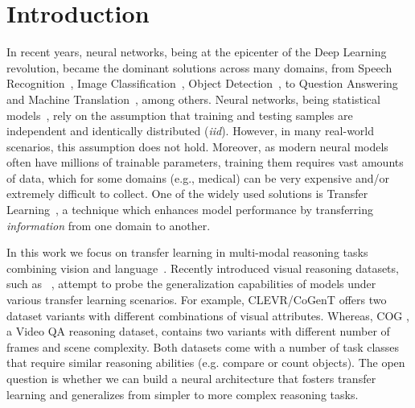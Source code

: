 \section{Introduction}
In recent years, neural networks, being at the epicenter of the Deep Learning~\cite{lecun2015deep} revolution, became the dominant solutions across many domains, from Speech Recognition~\cite{graves2013speech}, Image Classification~\cite{krizhevsky2012imagenet}, Object Detection~\cite{redmon2016you}, to Question Answering~\cite{weston2014memory} and Machine Translation~\cite{bahdanau2014neural}, among others.
Neural networks, being statistical models~\cite{ripley1993statistical,warner1996understanding}, rely on the assumption that training and testing samples are independent and identically distributed (\textit{iid}).
However, in many real-world scenarios, this assumption does not hold. Moreover, as modern neural models often have millions of trainable parameters, training them requires vast amounts of data, which for some domains (e.g., medical) can be very expensive and/or extremely difficult to collect.
One of the widely used solutions is Transfer Learning~\cite{pan2009survey,weiss2016survey}, a technique which enhances model performance by transferring \emph{information} from one domain to another.


In this work we focus on transfer learning in multi-modal reasoning tasks combining vision and language~\cite{mogadala2019trends}. Recently introduced visual reasoning datasets, such as ~\cite{johnson2017clevr,yang2018dataset,song2018explore}, attempt to probe the generalization capabilities of models under various transfer learning scenarios. For example, CLEVR/CoGenT \cite{johnson2017clevr} offers two dataset variants with different combinations of visual attributes. Whereas, COG \cite{yang2018dataset}, a Video QA reasoning dataset, contains two variants with different number of frames and scene complexity.  Both datasets come with a number of task classes that require similar reasoning abilities (e.g. compare or count objects).
The open question is whether we can build a neural architecture that fosters transfer learning and generalizes from simpler to more complex reasoning tasks.


